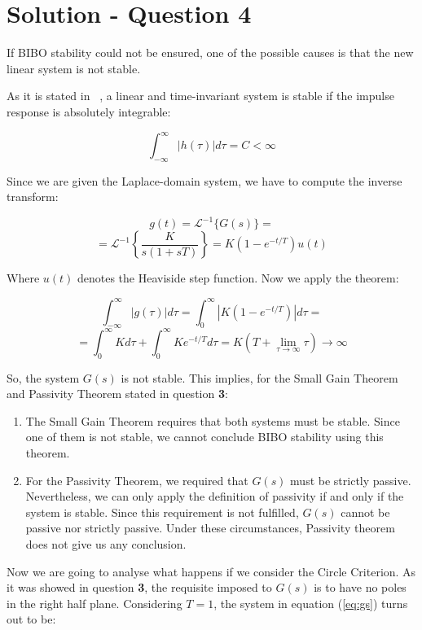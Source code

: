 \section*{Solution - Question 4}
If BIBO stability could not be ensured, one of the possible causes is that the new linear system is not stable. 

As it is stated in ~\cite[p. 99]{Oppenheim:2002:Signals-and-systems}, a linear and time-invariant system is stable if the impulse response is absolutely integrable:

$$
\int_{-\infty}^{\infty} |h(\tau)| d\tau = C < \infty
$$

Since we are given the Laplace-domain system, we have to compute the inverse transform:

$$
g(t) = \mathcal{L}^{-1} \{G(s)\} = 
$$
$$
= \mathcal{L}^{-1} \left\{ \frac{K}{s(1+sT)} \right\} = K \left( 1 - e^{-t/T} \right) u(t)
$$

Where $u(t)$ denotes the Heaviside step function. Now we apply the theorem:

$$
\int_{-\infty}^{\infty} |g(\tau)| d\tau = \int_{0}^{\infty} \left| K \left( 1 - e^{-t/T} \right) \right| d\tau =
$$
$$
= \int_{0}^{\infty} K d\tau + \int_{0}^{\infty} Ke^{-t/T}  d\tau = K( T + \lim_{\tau \to \infty}\tau) \to \infty 
$$

So, the system $G(s)$ is not stable. This implies, for the Small Gain Theorem and Passivity Theorem stated in question \textbf{3}:

\begin{enumerate}
\item The Small Gain Theorem requires that both systems must be stable. Since one of them is not stable, we cannot conclude BIBO stability using this theorem. 

\item For the Passivity Theorem, we required that $G(s)$ must be strictly passive. Nevertheless, we can only apply the definition of passivity if and only if the system is stable. Since this requirement is not fulfilled, $G(s)$ cannot be passive nor strictly passive. Under these circumstances, Passivity theorem does not give us any conclusion. 
\end{enumerate}

Now we are going to analyse what happens if we consider the Circle Criterion. As it was showed in question \textbf{3}, the requisite imposed to $G(s)$ is to have no poles in the right half plane. Considering $T=1$, the system in equation (\ref{eq:gs}) turns out to be:

